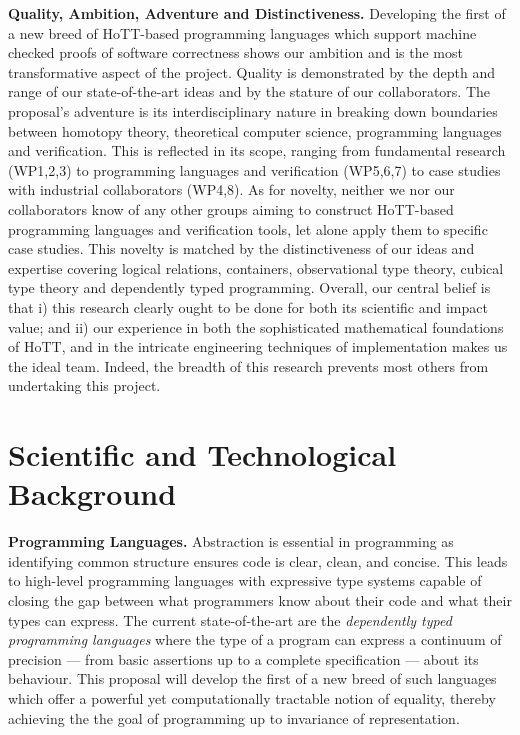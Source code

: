 \documentclass[a4paper,11pt]{article}
\begin{document}
  {\bf Quality, Ambition, Adventure and Distinctiveness.} 
  Developing the first of a new breed of HoTT-based programming
  languages which support machine checked proofs of software
  correctness shows our ambition and is the most transformative
  aspect of the project. Quality is demonstrated by
  the depth and range of our state-of-the-art ideas and by the stature
  of our collaborators. The proposal's adventure is its
  interdisciplinary nature in breaking down boundaries between
  homotopy theory, theoretical computer science, programming languages
  and verification. This is reflected in its scope, ranging from
  fundamental research (WP1,2,3) to programming languages and
  verification (WP5,6,7) to case studies with
  industrial collaborators (WP4,8). As for novelty, neither we
  nor our collaborators know of any other groups aiming to construct
  HoTT-based programming languages and verification tools, let alone
  apply them to specific case studies. This novelty is matched
  by the distinctiveness of our ideas and expertise covering logical
  relations, containers, observational type theory, cubical type
  theory and dependently typed programming.  Overall, our central
  belief is that i) this research clearly ought to be done for both
  its scientific and impact value; and ii) our experience in both the
  sophisticated mathematical foundations of HoTT, and in the intricate
  engineering techniques of implementation makes us the ideal team.
  Indeed, the breadth of this research prevents most others from
  undertaking this project.

\vspace*{-0.1in} 
\vspace*{-0.1in} 
\section{Scientific and Technological Background}
\vspace*{-0.1in} 

{\bf Programming Languages.} Abstraction is essential in programming
as identifying common structure ensures code is clear, clean, and
concise. This leads to high-level programming languages with
expressive type systems capable of closing the gap between what
programmers know about their code and what their types can express.
The current state-of-the-art are the {\em dependently typed
  programming languages} where the type of a program can express a
continuum of precision --- from basic assertions up to a complete
specification --- about its behaviour. This proposal will develop the
first of a new breed of such languages which offer a powerful yet
computationally tractable notion of equality, thereby achieving the
the goal of programming up to invariance of representation.
\end{document}
